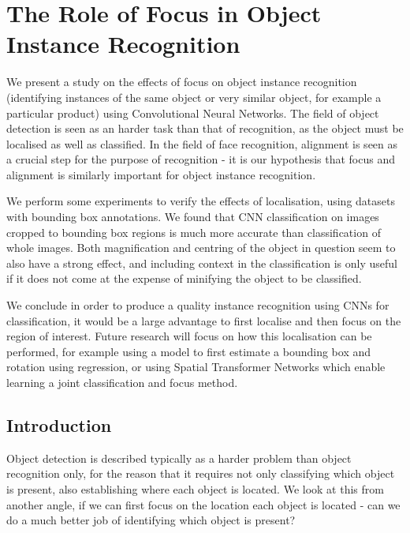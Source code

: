 
\chapter{The Role of Focus in Object Instance Recognition}




We present a study on the effects of focus on object instance recognition (identifying instances of the same object or very similar object, for example a particular product) using Convolutional Neural Networks. The field of object detection is seen as an harder task than that of recognition, as the object must be localised as well as classified. In the field of face recognition, alignment is seen as a crucial step for the purpose of recognition - it is our hypothesis that focus and alignment is similarly important for object instance recognition. 

We perform some experiments to verify the effects of localisation, using datasets with bounding box annotations. We found that CNN classification on images cropped to bounding box regions is much more accurate than classification of whole images. Both magnification and centring of the object in question seem to also have a strong effect, and including context in the classification is only useful if it does not come at the expense of minifying the object to be classified.
 
We conclude in order to produce a quality instance recognition using CNNs for classification, it would be a large advantage to first localise and then focus on the region of interest. Future research will focus on how this localisation can be performed, for example using a model to first estimate a bounding box and rotation using regression, or using Spatial Transformer Networks which enable learning a joint classification and focus method.




\section{Introduction}

Object detection is described typically as a harder problem than object recognition only, for the reason that it requires not only classifying which object is present, also establishing where each object is located. We look at this from another angle, if we can first focus on the location each object is located - can we do a much better job of identifying which object is present? 

